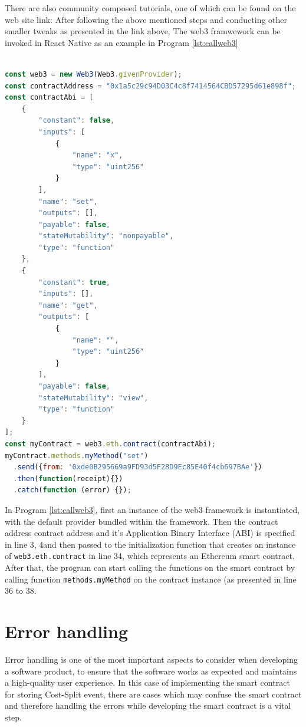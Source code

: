 There are also community composed tutorials, one of which can be found on the web site link: \citep{InstallWeb3}
After following the above mentioned steps and conducting other smaller tweaks as presented in the link above, The web3 framwework can be invoked in React Native as an example in Program \ref{lst:callweb3}

\begin{lstlisting}[float,caption={Calling Web3 functions and making transactions on the Ethereum blockchain \citep{SolidityDocumentation}.},label={lst:callweb3},language=Javascript]

const web3 = new Web3(Web3.givenProvider);
const contractAddress = "0x1a5c29c94D03C4c8f7414564CBD57295d61e898f";
const contractAbi = [
	{
		"constant": false,
		"inputs": [
			{
				"name": "x",
				"type": "uint256"
			}
		],
		"name": "set",
		"outputs": [],
		"payable": false,
		"stateMutability": "nonpayable",
		"type": "function"
	},
	{
		"constant": true,
		"inputs": [],
		"name": "get",
		"outputs": [
			{
				"name": "",
				"type": "uint256"
			}
		],
		"payable": false,
		"stateMutability": "view",
		"type": "function"
	}
];
const myContract = web3.eth.contract(contractAbi);
myContract.methods.myMethod("set")
  .send({from: '0xde0B295669a9FD93d5F28D9Ec85E40f4cb697BAe'})
  .then(function(receipt){})
  .catch(function (error) {});

\end{lstlisting}

In Program \ref{lst:callweb3}, first an instance of the web3 framework is instantiated, with the default provider bundled within the framework. Then the contract address contract address and it's Application Binary Interface (ABI) is specified in line 3, 4and then passed to the initialization function that creates an instance of \texttt{web3.eth.contract} in line 34, which represents an Ethereum smart contract. After that, the program can start calling the functions on the smart contract by calling function \texttt{methods.myMethod} on the contract instance (as presented in line 36 to 38.

\section{Error handling}

Error handling is one of the most important aspects to consider when developing a software product, to ensure that the software works as expected and maintains a high-quality user experience. In this case of implementing the smart contract for storing Cost-Split event, there are cases which may confuse the smart contract and therefore handling the errors while developing the smart contract is a vital step.

